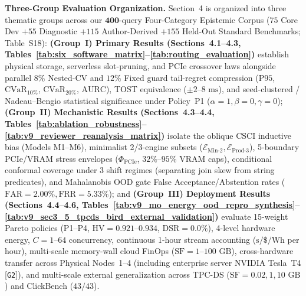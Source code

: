 \documentclass[10pt,a4paper]{article}
\begin{document}
\par\vspace{3pt}\noindent\textbf{Three-Group Evaluation Organization.} Section~4 is organized into three thematic groups across our $\mathbf{400}$-query Four-Category Epistemic Corpus ($75$ Core Dev $+ 55$ Diagnostic $+ 115$ Author-Derived $+ 155$ Held-Out Standard Benchmarks; Table~S18): \textbf{(Group~I) Primary Results (Sections~4.1--4.3, Tables~\ref{tab:six_software_matrix}--\ref{tab:routing_evaluation})} establish physical storage, serverless slot-pruning, and PCIe crossover laws alongside parallel $8\%$ Nested-CV and $12\%$ Fixed guard tail-regret compression ($\text{P95}$, $\text{CVaR}_{10\%}$, $\text{CVaR}_{20\%}$, $\text{AURC}$), TOST equivalence ($\pm 2\text{--}8\text{ ms}$), and seed-clustered / Nadeau--Bengio statistical significance under Policy~P1 ($\alpha=1,\beta=0,\gamma=0$); \textbf{(Group~II) Mechanistic Results (Sections~4.3--4.4, Tables~\ref{tab:ablation_robustness}--\ref{tab:v9_reviewer_reanalysis_matrix})} isolate the oblique $\text{CSCI}$ inductive bias (Models M1--M6), minimalist 2/3-engine subsets ($\mathcal{E}_{\text{Min-2}}, \mathcal{E}_{\text{Prod-3}}$), 5-boundary PCIe/VRAM stress envelopes ($\Phi_{\text{PCIe}}$, $32\%\text{--}95\%$ VRAM caps), conditional conformal coverage under 3 shift regimes (separating join skew from string predicates), and Mahalanobis OOD gate False Acceptance/Abstention rates ($\text{FAR}=2.00\%, \text{FRR}=5.33\%$); and \textbf{(Group~III) Deployment Results (Sections~4.4--4.6, Tables~\ref{tab:v9_mo_energy_ood_repro_synthesis}--\ref{tab:v9_sec3_5_tpcds_bird_external_validation})} evaluate 15-weight Pareto policies (P1--P4, $\text{HV}=0.921\text{--}0.934$, $\text{DSR}=0.0\%$), 4-level hardware energy, $C=1\text{--}64$ concurrency, continuous 1-hour stream accounting ($\text{s}/\$/\text{Wh}$ per hour), multi-scale memory-wall cloud FinOps ($\text{SF}=1\text{--}100\text{ GB}$), cross-hardware transfer across Physical Nodes~1--4 (including enterprise server NVIDIA Tesla~T4 [\texttt{G2}]), and multi-scale external generalization across TPC-DS ($\text{SF}=0.02, 1, 10\text{ GB}$) and ClickBench ($43/43$).
\end{document}
